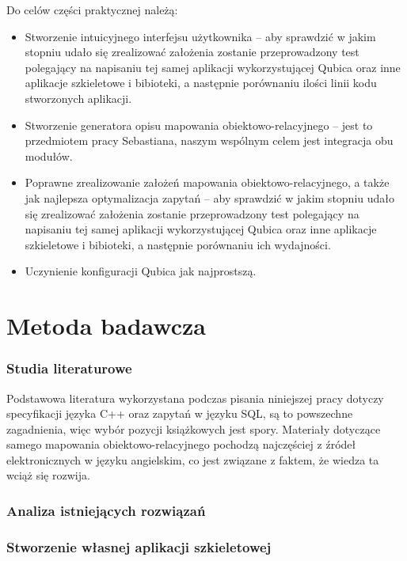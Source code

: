 \documentclass[12pt]{report}
\begin{document}
Do celów części praktycznej należą:

\begin{itemize}
\item Stworzenie intuicyjnego interfejsu użytkownika -- aby sprawdzić w jakim stopniu udało się zrealizować założenia zostanie przeprowadzony test polegający na napisaniu
tej samej aplikacji wykorzystującej Qubica oraz inne aplikacje szkieletowe i bibioteki, a następnie porównaniu ilości linii kodu stworzonych aplikacji.
\item Stworzenie generatora opisu mapowania obiektowo-relacyjnego -- jest to przedmiotem pracy Sebastiana, naszym wspólnym celem jest integracja obu modułów.
\item Poprawne zrealizowanie założeń mapowania obiektowo-relacyjnego, a także jak najlepsza optymalizacja zapytań -- aby sprawdzić w jakim stopniu udało się zrealizować
założenia zostanie przeprowadzony test polegający na napisaniu tej samej aplikacji wykorzystującej Qubica oraz inne aplikacje szkieletowe i bibioteki, a następnie porównaniu
ich wydajności.
\item Uczynienie konfiguracji Qubica jak najprostszą.
\end{itemize}

\section{Metoda badawcza}

\subsubsection{Studia literaturowe} %

Podstawowa literatura wykorzystana podczas pisania niniejszej pracy dotyczy specyfikacji języka C++ oraz zapytań w języku SQL, są to powszechne zagadnienia, więc wybór
pozycji książkowych jest spory. Materiały dotyczące samego mapowania obiektowo-relacyjnego pochodzą najczęściej z źródeł elektronicznych w języku angielskim, co jest
związane z faktem, że wiedza ta wciąż się rozwija.

\subsubsection{Analiza istniejących rozwiązań}

\subsubsection{Stworzenie własnej aplikacji szkieletowej}
\end{document}
